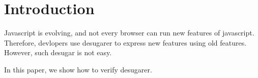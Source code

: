 \section{Introduction}
Javascript is evolving, and not every browser can run new features of javascript. Therefore, devlopers use desugarer to express new features using old features. However, such desugar is not easy.

In this paper, we show how to verify desugarer.
